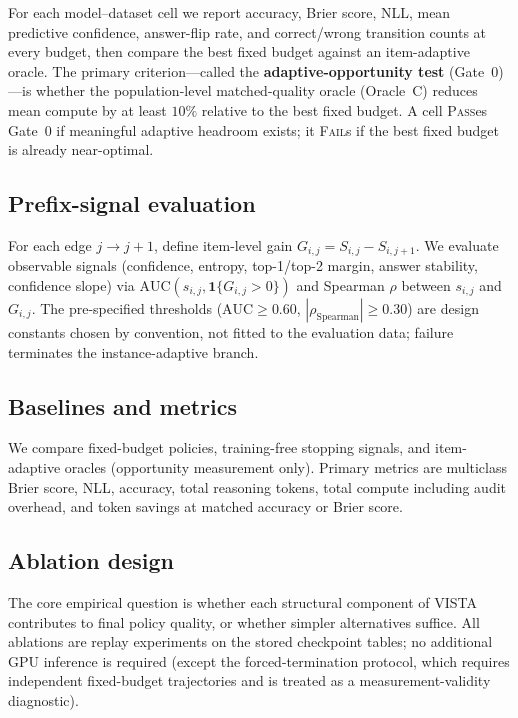 \documentclass[a4paper,fleqn]{cas-sc}
\newcommand{\Brier}{S}
\newcommand{\Ind}{\mathbf{1}}
\theoremstyle{plain}
\theoremstyle{definition}
\theoremstyle{remark}
\begin{document}
For each model--dataset cell we report accuracy, Brier score, NLL, mean
predictive confidence, answer-flip rate, and correct/wrong transition counts
at every budget, then compare the best fixed budget against an item-adaptive
oracle. The primary criterion---called the \textbf{adaptive-opportunity test}
(Gate~0)---is whether the population-level matched-quality oracle (Oracle~C)
reduces mean compute by at least $10\%$ relative to the best fixed budget.
A cell \textsc{Pass}es Gate~0 if meaningful adaptive headroom exists;
it \textsc{Fail}s if the best fixed budget is already near-optimal.

\subsection{Prefix-signal evaluation}

For each edge $j\!\rightarrow\!j{+}1$, define item-level gain
$G_{i,j} = \Brier_{i,j}-\Brier_{i,j+1}$.
We evaluate observable signals (confidence, entropy, top-1/top-2 margin,
answer stability, confidence slope) via
$\mathrm{AUC}(s_{i,j},\Ind\{G_{i,j}>0\})$
and Spearman $\rho$ between $s_{i,j}$ and $G_{i,j}$.
The pre-specified thresholds ($\mathrm{AUC}\geq0.60$,
$|\rho_{\mathrm{Spearman}}|\geq0.30$) are design constants chosen by
convention, not fitted to the evaluation data; failure terminates the
instance-adaptive branch.

\subsection{Baselines and metrics}

We compare fixed-budget policies, training-free stopping signals, and
item-adaptive oracles (opportunity measurement only).
Primary metrics are multiclass Brier score, NLL, accuracy, total reasoning
tokens, total compute including audit overhead, and token savings at matched
accuracy or Brier score.

\subsection{Ablation design}
\label{sec:ablation-design}

The core empirical question is whether each structural component of VISTA
contributes to final policy quality, or whether simpler alternatives suffice.
All ablations are replay experiments on the stored checkpoint tables; no
additional GPU inference is required (except the forced-termination protocol,
which requires independent fixed-budget trajectories and is treated as a
measurement-validity diagnostic).
\end{document}
